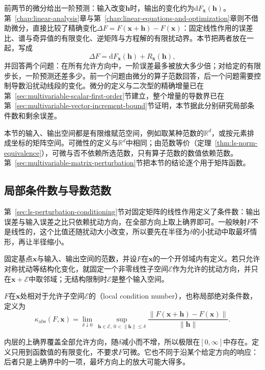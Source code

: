 前两节的微分给出一阶预测：输入改变$\bm h$时，输出的变化约为$\mathrm dF_{\bm x}(\bm h)$。第~\ref{chap:linear-analysis}章与第~\ref{chap:linear-equations-and-optimization}章则不借助微分，直接比较了精确变化$\Delta F=F(\bm x+\bm h)-F(\bm x)$：固定线性作用的误差比、谱与奇异值的有限变化、逆矩阵与方程解的有限扰动界。本节把两者放在一起，写成
\[
 \Delta F=\mathrm dF_{\bm x}(\bm h)+R_{\bm x}(\bm h),
\]
并回答两个问题：在所有允许方向中，一阶误差最多被放大多少倍；对给定的有限步长，一阶预测还差多少。前一个问题由微分的算子范数回答，后一个问题需要控制导数沿扰动线段的变化。微分的定义与二次型的精确增量已在第~\ref{sec:multivariable-scalar-first-order}节建立，整个增量的导数界已在第~\ref{sec:multivariable-vector-increment-bound}节证明，本节据此分别研究局部条件数和剩余误差。

本节的输入、输出空间都是有限维赋范空间，例如取某种范数的$\mathbb R^d$，或按元素排成坐标的矩阵空间。可微性的定义与$\mathbb R^d$中相同；由范数等价（定理~\ref{thm:ls-norm-equivalence}），可微与否不依赖所选范数，只有算子范数的数值依赖范数。第~\ref{sec:multivariable-matrix-perturbation}节把本节的结论逐个用于矩阵函数。

\subsection{局部条件数与导数范数}
\label{sec:multivariable-local-condition-number}

第~\ref{sec:ls-perturbation-conditioning}节对固定矩阵的线性作用定义了条件数：输出误差与输入误差之比只依赖扰动方向，在全部方向上取上确界即可。一般映射$F$不是线性的，这个比值还随扰动大小改变，所以要先在半径为$\delta$的小扰动中取最坏情形，再让半径缩小。

固定基点$\bm x$与输入、输出空间的范数，并设$F$在$\bm x$的一个开邻域内有定义。若只允许对称扰动等结构化变化，就固定一个非零线性子空间$\mathcal E$作为允许的扰动方向，并只在$\bm x+\mathcal E$中取邻域；无结构限制时$\mathcal E$是整个输入空间。
\begin{definition}[局部条件数]
\label{def:multivariable-local-condition-number}
$F$在$\bm x$处相对于允许子空间$\mathcal E$的（local condition number），也称局部绝对条件数，定义为
\[
 \kappa_{\mathrm{abs}}(F,\bm x)=\lim_{\delta\downarrow0}\ \sup_{\bm h\in\mathcal E,\ 0<\lVert\bm h\rVert\leq\delta}\frac{\lVert F(\bm x+\bm h)-F(\bm x)\rVert}{\lVert\bm h\rVert}.
\]
\end{definition}
内层的上确界覆盖全部允许方向，随$\delta$减小而不增，所以极限在$[0,\infty]$中存在。定义只用到函数值的有限变化，不要求$F$可微。它也不同于沿某个给定方向的响应：后者只是上确界中的一项，最坏方向上的放大可能大得多。

